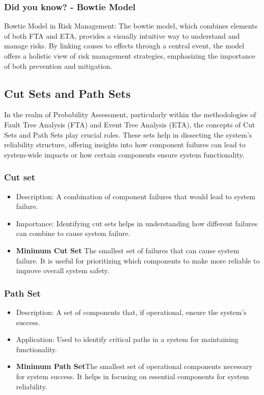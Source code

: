 \newpage \subsubsection*{Did you know? - Bowtie Model}
\begin{mdframed}[backgroundcolor=gray!20] 
Bowtie Model in Risk Management: The bowtie model, which combines elements of both FTA and ETA, provides a visually intuitive way to understand and manage risks. By linking causes to effects through a central event, the model offers a holistic view of risk management strategies, emphasizing the importance of both prevention and mitigation.
\end{mdframed}

\subsection*{Cut Sets and Path Sets}
In the realm of Probability Assessment, particularly within the methodologies of Fault Tree Analysis (FTA) and Event Tree Analysis (ETA), the concepts of Cut Sets and Path Sets play crucial roles. These sets help in dissecting the system's reliability structure, offering insights into how component failures can lead to system-wide impacts or how certain components ensure system functionality. 

\subsubsection*{Cut set}
    \begin{itemize}
        \item Description: A combination of component failures that would lead to system failure.
        \item Importance: Identifying cut sets helps in understanding how different failures can combine to cause system failure.
        \item \textbf{Minimum Cut Set} The smallest set of failures that can cause system failure. It is useful for prioritizing which components to make more reliable to improve overall system safety.
    \end{itemize}
\subsubsection*{Path Set}
    \begin{itemize}
        \item Description: A set of components that, if operational, ensure the system's success.
        \item Application: Used to identify critical paths in a system for maintaining functionality.
        \item \textbf{Minimum Path Set}The smallest set of operational components necessary for system success. It helps in focusing on essential components for system reliability.
    \end{itemize}

